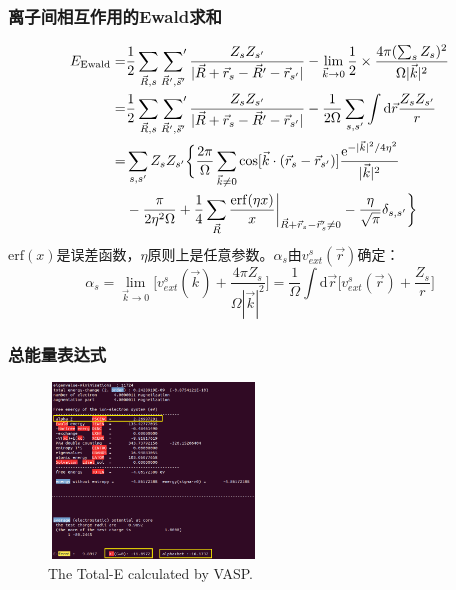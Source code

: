 \documentclass[cjk,slidestop,handout,compress,mathserif,blue]{beamer}	%
\begin{document}
\frame
{
	\frametitle{离子间相互作用的\textrm{Ewald}求和}
	\begin{displaymath}
		\begin{aligned}
			E_{\textrm{Ewald}}=&\dfrac12\sum_{\vec R,s}\sideset{}{^{\prime}}\sum_{\vec R^{\prime},\vec s^{\prime}}\dfrac{Z_sZ_{s^{\prime}}}{|\vec R+\vec r_s-\vec R^{\prime}-\vec r_{s^{\prime}}|}-\lim_{\vec k\rightarrow0}\dfrac12\times\dfrac{4\pi(\sum_sZ_s)^2}{\Omega|\vec k|^2}\\
			=&\dfrac12\sum_{\vec R,s}\sideset{}{^{\prime}}\sum_{\vec R^{\prime},\vec s^{\prime}}\dfrac{Z_sZ_{s^{\prime}}}{|\vec R+\vec r_s-\vec R^{\prime}-\vec r_{s^{\prime}}|}-\dfrac1{2\Omega}\sum_{s,s^{\prime}}\int\mathrm{d}\vec r\dfrac{Z_sZ_{s^{\prime}}}r\\
			=&\sum_{s,s^{\prime}}Z_sZ_{s^{\prime}}\bigg\{\dfrac{2\pi}{\Omega}\sum_{\vec k\neq 0}\cos[\vec k\cdot(\vec r_s-\vec r_{s^{\prime}})]\dfrac{\mathrm{e}^{-|\vec k|^2/4\eta^2}}{|\vec k|^2}\\
			&-\dfrac{\pi}{2\eta^2\Omega}+\dfrac14\sum_{\vec R}\dfrac{\mathrm{erf}(\eta x)}x\bigg|_{\vec R+\vec r_s-\vec r_s^{\prime}\neq0}-\dfrac{\eta}{\sqrt{\pi}}\delta_{s,s^{\prime}}\bigg\}
		\end{aligned}
	\end{displaymath}
	$\mathrm{erf}(x)$是误差函数，$\eta$原则上是任意参数。$\alpha_s$由$v_{ext}^s(\vec r)$确定：
	\begin{displaymath}
		\alpha_s=\lim_{\vec k\rightarrow0}\bigg[v_{ext}^s(\vec k)+\dfrac{4\pi Z_s}{\Omega|\vec k|^2}\bigg]=\dfrac1{\Omega}\int\mathrm{d}\vec r\bigg[v_{ext}^s(\vec r)+\dfrac{Z_s}r\bigg]
	\end{displaymath}
}

\frame
{
	\frametitle{总能量表达式}
\fontsize{6.5pt}{4.2pt}
\begin{figure}[h!]
\centering
\vspace*{-0.18in}
\includegraphics[height=1.85in,width=2.2in,viewport=0 0 600 495,clip]{Figures/VASP_Total_ENE.png}
\caption{\small \textrm{The Total-E calculated by VASP.}}%
\label{TOTEN_VASP}
\end{figure}
}
\end{document}
